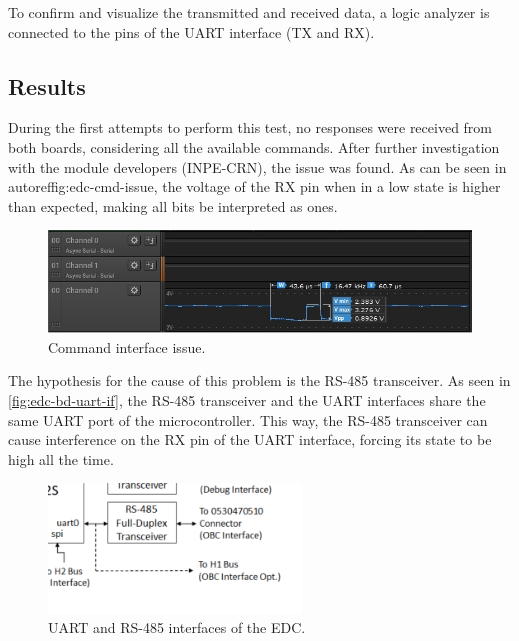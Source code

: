 To confirm and visualize the transmitted and received data, a logic analyzer is connected to the pins of the UART interface (TX and RX).

\subsection{Results}

During the first attempts to perform this test, no responses were received from both boards, considering all the available commands. After further investigation with the module developers (INPE-CRN), the issue was found. As can be seen in autoref{fig:edc-cmd-issue}, the voltage of the RX pin when in a low state is higher than expected, making all bits be interpreted as ones.

\begin{figure}[!ht]
    \begin{center}
        \includegraphics[width=\textwidth]{figures/edc_report/edc-cmd-issue}
        \caption{Command interface issue.}
        \label{fig:edc-cmd-issue}
    \end{center}
\end{figure}

The hypothesis for the cause of this problem is the RS-485 transceiver. As seen in \autoref{fig:edc-bd-uart-if}, the RS-485 transceiver and the UART interfaces share the same UART port of the microcontroller. This way, the RS-485 transceiver can cause interference on the RX pin of the UART interface, forcing its state to be high all the time.

\begin{figure}[!ht]
    \begin{center}
        \includegraphics[width=0.6\textwidth]{figures/edc_report/edc-bd-uart-if}
        \caption{UART and RS-485 interfaces of the EDC.}
        \label{fig:edc-bd-uart-if}
    \end{center}
\end{figure}

